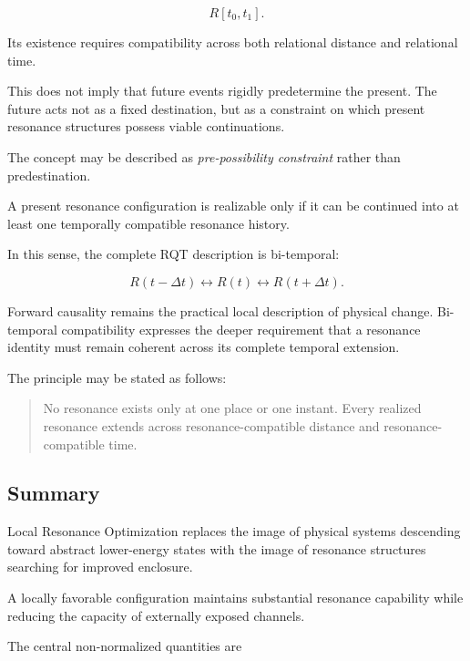 \documentclass[11pt,a4paper]{article}
\begin{document}
\begin{equation}
    R[t_0,t_1].
\end{equation}

Its existence requires compatibility across both relational distance and relational time.

This does not imply that future events rigidly predetermine the present. The future acts not as a fixed destination, but as a constraint on which present resonance structures possess viable continuations.

The concept may be described as \emph{pre-possibility constraint} rather than predestination.

A present resonance configuration is realizable only if it can be continued into at least one temporally compatible resonance history.

In this sense, the complete RQT description is bi-temporal:

\begin{equation}
    R(t-\Delta t)
    \leftrightarrow
    R(t)
    \leftrightarrow
    R(t+\Delta t).
\end{equation}

Forward causality remains the practical local description of physical change. Bi-temporal compatibility expresses the deeper requirement that a resonance identity must remain coherent across its complete temporal extension.

The principle may be stated as follows:

\begin{quote}
No resonance exists only at one place or one instant. Every realized resonance extends across resonance-compatible distance and resonance-compatible time.
\end{quote}



\subsection{Summary}
\label{sec:local_resonance_optimization_summary}

Local Resonance Optimization replaces the image of physical systems descending toward abstract lower-energy states with the image of resonance structures searching for improved enclosure.

A locally favorable configuration maintains substantial resonance capability while reducing the capacity of externally exposed channels.

The central non-normalized quantities are
\end{document}

